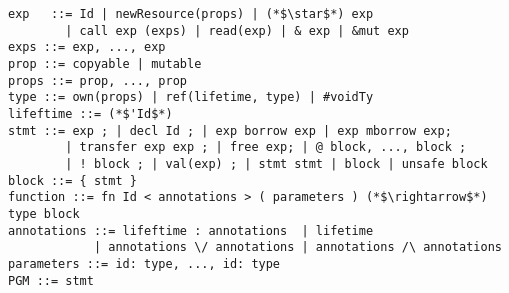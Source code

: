\begin{lstlisting}[float=ht,caption=OSL$_{\mathcal{OS}}$ syntax, style=osl,label=lst:syntax-osl]
exp   ::= Id | newResource(props) | (*$\star$*) exp
        | call exp (exps) | read(exp) | & exp | &mut exp
exps ::= exp, ..., exp
prop ::= copyable | mutable
props ::= prop, ..., prop
type ::= own(props) | ref(lifetime, type) | #voidTy
lifeftime ::= (*$'Id$*)
stmt ::= exp ; | decl Id ; | exp borrow exp | exp mborrow exp;
        | transfer exp exp ; | free exp; | @ block, ..., block ;
        | ! block ; | val(exp) ; | stmt stmt | block | unsafe block
block ::= { stmt }
function ::= fn Id < annotations > ( parameters ) (*$\rightarrow$*) type block
annotations ::= lifeftime : annotations  | lifetime
            | annotations \/ annotations | annotations /\ annotations
parameters ::= id: type, ..., id: type
PGM ::= stmt
\end{lstlisting}